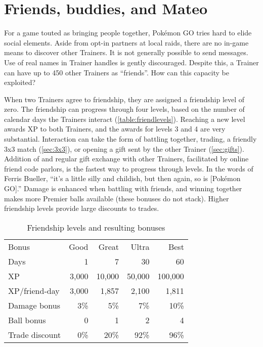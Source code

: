\chapter{Friends, buddies, and Mateo\label{chap:friends}}
For a game touted as bringing people together, Pokémon GO tries hard to elide social elements.
Aside from opt-in partners at local raids, there are no in-game means to discover other Trainers.
It is not generally possible to send messages.
Use of real names in Trainer handles is gently discouraged.
Despite this, a Trainer can have up to 450 other Trainers as ``friends''.
How can this capacity be exploited?

When two Trainers agree to friendship, they are assigned a friendship level of zero.
The friendship can progress through four levels, based on the number of calendar
  days the Trainers interact (\autoref{table:friendlevels}).
Reaching a new level awards XP to both Trainers, and the awards for levels 3 and 4 are very substantial.
Interaction can take the form of battling together, trading, a friendly 3x3 match (\autoref{sec:3x3}), or
  opening a gift sent by the other Trainer (\autoref{sec:gifts}).
Addition of and regular gift exchange with other Trainers, facilitated by online friend code parlors,
  is the fastest way to progress through levels.
In the words of Ferris Bueller, ``it's a little silly and childish, but then again, so is [Pokémon GO].''
Damage is enhanced when battling with friends, and winning together
  makes more Premier balls available (these bonuses do not stack).
Higher friendship levels provide large discounts to trades.
\begin{table}
\centering
\begin{tabular}{lrrrr}
Bonus & Good & Great & Ultra & Best\\
\Midrule
Days & 1 & 7 & 30 & 60\\
XP  & 3,000 & 10,000 & 50,000 & 100,000\\
XP/friend-day & 3,000 & 1,857 & 2,100 & 1,811\\
Damage bonus & 3\% & 5\% & 7\% & 10\%\\
Ball bonus & 0 & 1 & 2 & 4\\
Trade discount & 0\% & 20\% & 92\% & 96\% \\
\end{tabular}
  \caption{Friendship levels and resulting bonuses\label{table:friendlevels}}
\end{table}

